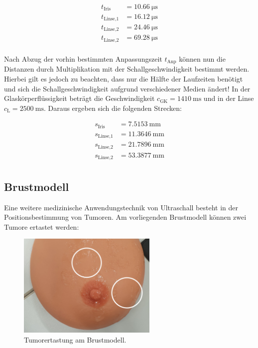 \begin{align*}
    t_\text{Iris} &= \qty{10.66}{\micro\second}    \\ 
    t_\text{Linse,1} &= \qty{16.12}{\micro\second} \\
    t_\text{Linse,2} &= \qty{24.46}{\micro\second} \\
    t_\text{Linse,2} &= \qty{69.28}{\micro\second} \\
\end{align*}

\noindent Nach Abzug der vorhin bestimmten Anpassungszeit $t_\text{Anp}$ können nun die Distanzen durch Multiplikation mit der 
Schallgeschwindigkeit bestimmt werden. Hierbei gilt es jedoch zu beachten, dass nur die Hälfte der Laufzeiten benötigt und sich 
die Schallgeschwindigkeit aufgrund verschiedener Medien ändert! In der Glaskörperflüssigkeit beträgt die Geschwindigkeit $c_\text{GK}=
\qty{1410}{\meter\second}$ und in der Linse $c_\text{L} = \qty{2500}{\meter\second}$. Daraus ergeben sich die folgenden Strecken:


\begin{align*}
    s_\text{Iris} &= \qty{7.5153}{\milli\meter}     \\
    s_\text{Linse,1} &= \qty{11.3646}{\milli\meter} \\
    s_\text{Linse,2} &= \qty{21.7896}{\milli\meter} \\
    s_\text{Linse,2} &= \qty{53.3877}{\milli\meter} \\
\end{align*}

\subsection{Brustmodell}

\noindent Eine weitere medizinische Anwendungstechnik von Ultraschall besteht in der Positionsbestimmung von Tumoren. Am vorliegenden 
Brustmodell können zwei Tumore ertastet werden:

\begin{figure}
    \centering
    \includegraphics[height=5cm]{Tumororientierung2.jpg}
    \caption{Tumorertastung am Brustmodell.}
    \label{fig:Brust}
\end{figure}


